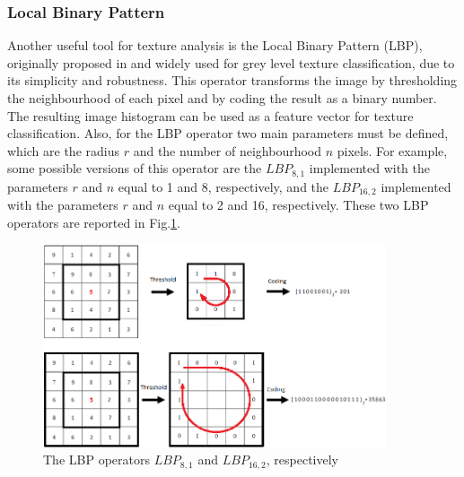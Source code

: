 \documentclass[final,a4paper,12pt,english]{UnicaPhdThesis3}
\begin{document}
\subsubsection{Local Binary Pattern} \label{LBP}
Another useful tool for texture analysis is the Local Binary Pattern (\acs{LBP}), originally proposed in \cite{Ojala} and widely used for grey level texture classification, due to its simplicity and robustness. This operator transforms the image by thresholding the neighbourhood of each pixel and by coding the result as a binary number. The resulting image histogram can be used as a feature vector for texture classification. Also, for the LBP operator two main parameters must be defined, which are the radius $r$ and the number of neighbourhood $n$ pixels. For example, some possible versions of this operator are the $LBP_{8,1}$ implemented with the parameters $r$ and $n$ equal to 1 and 8, respectively, and the  $LBP_{16,2}$ implemented with the parameters $r$ and $n$ equal to 2 and 16, respectively. These two LBP operators are reported in Fig.\ref{fig:LBP}.

\begin{figure}[!t]
\centering
\includegraphics[width=0.90\textwidth]{images/LBP}
\caption{\label{fig:LBP}The LBP operators $LBP_{8,1}$  and $LBP_{16,2}$, respectively  }
\end{figure}
\end{document}
